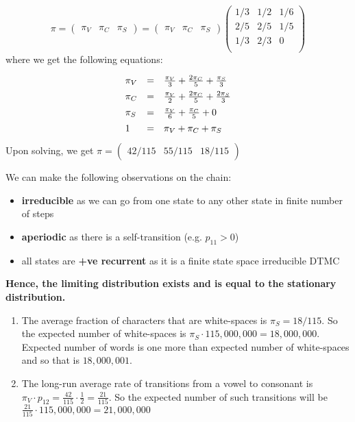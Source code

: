 \documentclass[12pt, oneside]{article}
\begin{document}
\begin{enumerate}
\[ \pi = \begin{pmatrix} \pi_V & \pi_C & \pi_S \end{pmatrix} = 
\begin{pmatrix} \pi_V & \pi_C & \pi_S \end{pmatrix}
\begin{pmatrix}
1/3    & 1/2    & 1/6    \\
2/5    & 2/5    & 1/5    \\
1/3    & 2/3    & 0      \\
\end{pmatrix}
\]
where we get the following equations:
        \[\def\arraystretch{1.4}
            \begin{array}{lcl}
            \pi_V & = & \frac{\pi_V}{3} + \frac{2\pi_C}{5} + \frac{\pi_S}{3} \\
            \pi_C & = & \frac{\pi_V}{2} + \frac{2\pi_C}{5} + \frac{2\pi_S}{3} \\
            \pi_S & = & \frac{\pi_V}{6} + \frac{\pi_C}{5} + 0 \\
            1 & = & \pi_V + \pi_C + \pi_S \\
            \end{array}
        \]
Upon solving, we get $\pi = \begin{pmatrix} 42/115 & 55/115 & 18/115 \end{pmatrix}$

We can make the following observations on the chain:
\begin{itemize}
    \item \textbf{irreducible} as we can go from one state to any other state in finite number of steps
    \item \textbf{aperiodic} as there is a self-transition (e.g. $p_{11} > 0$)
    \item all states are \textbf{+ve recurrent} as it is a finite state space irreducible DTMC
\end{itemize}
\textbf{Hence, the limiting distribution exists and is equal to the stationary distribution.}

\begin{enumerate}[label=(\alph*)]
\item The average fraction of characters that are white-spaces is $\pi_S = 18/115$. So the expected number of white-spaces is $\pi_S \cdot 115,000,000 = 18,000,000$. Expected number of words is one more than expected number of white-spaces and so that is $18,000,001$.

\item The long-run average rate of transitions from a vowel to consonant is $\pi_V \cdot p_{12} = \frac{42}{115}\cdot\frac{1}{2} = \frac{21}{115}$. So the expected number of such transitions will be $\frac{21}{115} \cdot 115,000,000 = 21,000,000$


\end{enumerate}
\end{enumerate}
\end{document}
